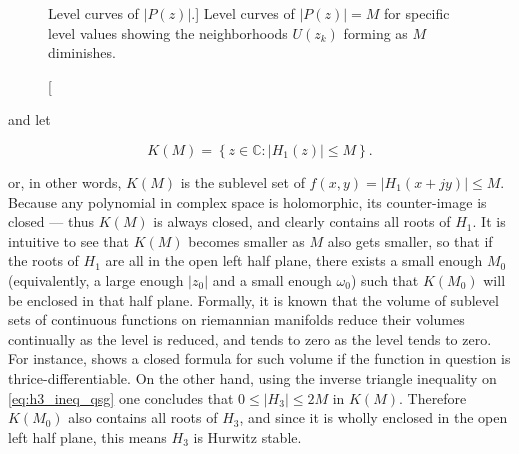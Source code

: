 \begin{figure}[t]
{
}
\caption
[Level curves of $\left\lvert P(z)\right\rvert$.]
{Level curves of $\left\lvert P(z)\right\rvert = M$ for specific level values showing the neighborhoods $U\left(z_k\right)$ forming as $M$ diminishes.}
\label{fig:pz_level_curves}
\end{figure} %

	\noindent and let

\begin{equation} K\left(M\right) = \left\{z\in\mathbb{C}: \left\lvert H_1(z)\right\rvert \leq  M\right\} .\end{equation}

	\noindent or, in other words, $K\left(M\right)$ is the sublevel set of $f(x,y) = \left\lvert H_1\left(x + jy\right)\right\rvert \leq M$. Because any polynomial in complex space is holomorphic, its counter-image is closed — thus $K(M)$ is always closed, and clearly contains all roots of $H_1$. It is intuitive to see that $K(M)$ becomes smaller as $M$ also gets smaller, so that if the roots of $H_1$ are all in the open left half plane, there exists a small enough $M_0$ (equivalently, a large enough $\left\lvert z_0\right\rvert$ and a small enough $\omega_0$) such that $K\left(M_0\right)$ will be enclosed in that half plane. Formally, it is known that the volume of sublevel sets of continuous functions on riemannian manifolds reduce their volumes continually as the level is reduced, and tends to zero as the level tends to zero. For instance, \cite{jubinIntrinsicVolumesSublevel2024} shows a closed formula for such volume if the function in question is thrice-differentiable. On the other hand, using the inverse triangle inequality on \eqref{eq:h3_ineq_qsg} one concludes that $0 \leq \left\lvert H_3\right\rvert \leq 2M$ in $K(M)$. Therefore $K\left(M_0\right)$ also contains all roots of $H_3$, and since it is wholly enclosed in the open left half plane, this means $H_3$ is Hurwitz stable.

